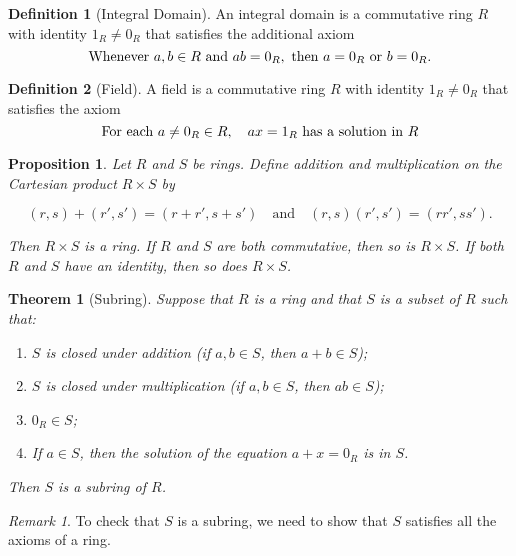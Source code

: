 \documentclass{article}
\newtheorem{theorem}{Theorem}[section]
\newtheorem{proposition}{Proposition}[section]
\theoremstyle{definition}
\newtheorem{definition}{Definition}[section]
\theoremstyle{remark}
\newtheorem{remark}{Remark}[section]
\begin{document}
\begin{definition}[Integral Domain]\label{def:integral domain}
An integral domain is a commutative ring \(R\) with identity \(1_R \neq 0_R\) that satisfies the additional axiom
\[
\textnormal{Whenever } a,b \in R \textnormal{ and } ab = 0_R, \textnormal{ then } a = 0_R \textnormal{ or } b = 0_R.
\]

\end{definition}


\begin{definition}[Field]\label{def:field}
A field is a commutative ring \(R\) with identity \(1_R \neq 0_R\) that satisfies the axiom 
\[
\textnormal{For each } a \neq 0_R \in R, \quad ax = 1_R \textnormal{ has a solution in \(R\)}
\]
\end{definition}









\begin{proposition}\label{prp:cartesian prod ring}
Let $R$ and $S$ be rings. Define addition and multiplication on the Cartesian product $R \times S$ by

\[
(r, s) + (r', s') = (r + r', s + s') \quad \text{and} \quad (r, s)(r', s') = (rr', ss').
\]

Then $R \times S$ is a ring. If $R$ and $S$ are both commutative, then so is $R \times S$. If both $R$ and $S$ have an identity, then so does $R \times S$.
\end{proposition}





\begin{theorem}[Subring] \label{thm:check for subring}
Suppose that $R$ is a ring and that $S$ is a subset of $R$ such that:
\begin{enumerate}
\item $S$ is closed under addition (if $a, b \in S$, then $a + b \in S$);
\item $S$ is closed under multiplication (if $a, b \in S$, then $ab \in S$);
\item $0_R \in S$;
\item If $a \in S$, then the solution of the equation $a + x = 0_R$ is in $S$.
\end{enumerate}
Then $S$ is a subring of $R$.
\end{theorem}
\begin{remark}
To check that $S$ is a subring, we need to show that $S$ satisfies all
the axioms of a ring.
\end{remark}
\end{document}
